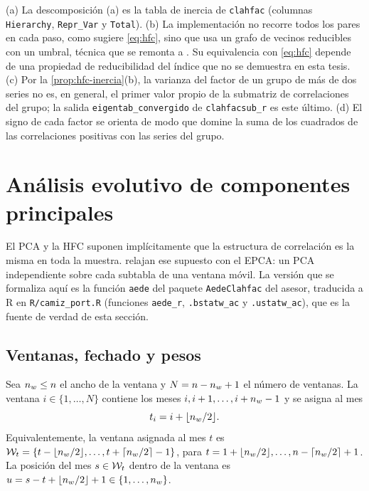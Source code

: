 \begin{observacion}\label{obs:hfc-codigo}
(a) La descomposición (a) es la tabla de inercia de \texttt{clahfac} (columnas
\texttt{Hierarchy}, \texttt{Repr\_Var} y \texttt{Total}). (b) La implementación no recorre todos
los pares en cada paso, como sugiere \cref{eq:hfc}, sino que usa un grafo de vecinos reducibles
con un umbral, técnica que se remonta a \textcite{bruynooghe_1978}. Su equivalencia con \cref{eq:hfc} depende de una propiedad de
reducibilidad del índice que no se demuestra en esta tesis. (c) Por la \cref{prop:hfc-inercia}(b), la varianza del factor de un grupo
de más de dos series no es, en general, el primer valor propio de la submatriz de correlaciones del
grupo; la salida \texttt{eigentab\_convergido} de \texttt{clahfacsub\_r} es este último.
(d) El signo de cada factor se orienta de modo que domine la suma de los cuadrados de las
correlaciones positivas con las series del grupo.
\end{observacion}

\section{Análisis evolutivo de componentes principales}
\label{sec:epca}

El PCA y la HFC suponen implícitamente que la estructura de correlación es la misma en toda la
muestra. \textcite{camiz_maulucci_roig_2010} relajan ese supuesto con el EPCA: un PCA
independiente sobre cada subtabla de una ventana móvil. La versión que se formaliza aquí es la
función \texttt{aede} del paquete \texttt{AedeClahfac} del asesor, traducida a R en
\texttt{R/camiz\_port.R} (funciones \texttt{aede\_r}, \texttt{.bstatw\_ac} y \texttt{.ustatw\_ac}),
que es la fuente de verdad de esta sección.

\subsection{Ventanas, fechado y pesos}

\begin{definicion}\label{def:ventana}
Sea $n_{w}\le n$ el ancho de la ventana y $N=n-n_{w}+1$ el número de ventanas. La ventana
$i\in\{1,\dots,N\}$ contiene los meses $i,i+1,\dots,i+n_{w}-1$ y se asigna al mes
\begin{equation}\label{eq:fechado}
  t_i=i+\lfloor n_{w}/2\rfloor .
\end{equation}
Equivalentemente, la ventana asignada al mes $t$ es
$\mathcal{W}_t=\{t-\lfloor n_{w}/2\rfloor,\dots,t+\lceil n_{w}/2\rceil-1\}$, para
$t=1+\lfloor n_{w}/2\rfloor,\dots,n-\lceil n_{w}/2\rceil+1$. La posición del mes $s\in\mathcal{W}_t$ dentro de
la ventana es $u=s-t+\lfloor n_{w}/2\rfloor+1\in\{1,\dots,n_{w}\}$.
\end{definicion}

